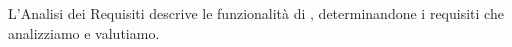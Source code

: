 L'Analisi dei Requisiti descrive le funzionalità di \progetto, determinandone i requisiti che analizziamo e valutiamo.
